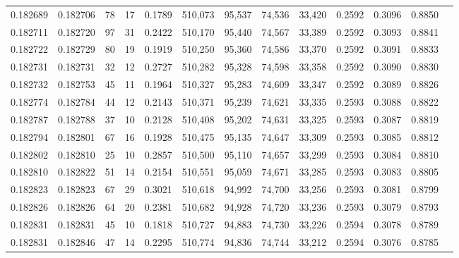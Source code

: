 \begin{tabular}{rrrrrrrrrrrrr}
0.182689 & 0.182706 &    78 &  17 &                                     0.1789 & 510,073 &  95,537 &  74,536 &  33,420 & 0.2592 & 0.3096 & 0.8850 \\
0.182711 & 0.182720 &    97 &  31 &                                     0.2422 & 510,170 &  95,440 &  74,567 &  33,389 & 0.2592 & 0.3093 & 0.8841 \\
0.182722 & 0.182729 &    80 &  19 &                                     0.1919 & 510,250 &  95,360 &  74,586 &  33,370 & 0.2592 & 0.3091 & 0.8833 \\
0.182731 & 0.182731 &    32 &  12 &                                     0.2727 & 510,282 &  95,328 &  74,598 &  33,358 & 0.2592 & 0.3090 & 0.8830 \\
0.182732 & 0.182753 &    45 &  11 &                                     0.1964 & 510,327 &  95,283 &  74,609 &  33,347 & 0.2592 & 0.3089 & 0.8826 \\
0.182774 & 0.182784 &    44 &  12 &                                     0.2143 & 510,371 &  95,239 &  74,621 &  33,335 & 0.2593 & 0.3088 & 0.8822 \\
0.182787 & 0.182788 &    37 &  10 &                                     0.2128 & 510,408 &  95,202 &  74,631 &  33,325 & 0.2593 & 0.3087 & 0.8819 \\
0.182794 & 0.182801 &    67 &  16 &                                     0.1928 & 510,475 &  95,135 &  74,647 &  33,309 & 0.2593 & 0.3085 & 0.8812 \\
0.182802 & 0.182810 &    25 &  10 &                                     0.2857 & 510,500 &  95,110 &  74,657 &  33,299 & 0.2593 & 0.3084 & 0.8810 \\
0.182810 & 0.182822 &    51 &  14 &                                     0.2154 & 510,551 &  95,059 &  74,671 &  33,285 & 0.2593 & 0.3083 & 0.8805 \\
0.182823 & 0.182823 &    67 &  29 &                                     0.3021 & 510,618 &  94,992 &  74,700 &  33,256 & 0.2593 & 0.3081 & 0.8799 \\
0.182826 & 0.182826 &    64 &  20 &                                     0.2381 & 510,682 &  94,928 &  74,720 &  33,236 & 0.2593 & 0.3079 & 0.8793 \\
0.182831 & 0.182831 &    45 &  10 &                                     0.1818 & 510,727 &  94,883 &  74,730 &  33,226 & 0.2594 & 0.3078 & 0.8789 \\
0.182831 & 0.182846 &    47 &  14 &                                     0.2295 & 510,774 &  94,836 &  74,744 &  33,212 & 0.2594 & 0.3076 & 0.8785 \\

\end{tabular}
